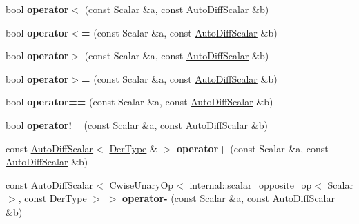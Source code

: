 \begin{DoxyCompactItemize}
bool {\bfseries operator$<$} (const Scalar \&a, const \hyperlink{class_eigen_1_1_auto_diff_scalar}{Auto\+Diff\+Scalar} \&b)
\item 
\mbox{\label{class_eigen_1_1_auto_diff_scalar_adbe3f187ba731644689b7908c1edbe22}} 
bool {\bfseries operator$<$=} (const Scalar \&a, const \hyperlink{class_eigen_1_1_auto_diff_scalar}{Auto\+Diff\+Scalar} \&b)
\item 
\mbox{\label{class_eigen_1_1_auto_diff_scalar_abf6b293bf812336bd22db1a4d1894751}} 
bool {\bfseries operator$>$} (const Scalar \&a, const \hyperlink{class_eigen_1_1_auto_diff_scalar}{Auto\+Diff\+Scalar} \&b)
\item 
\mbox{\label{class_eigen_1_1_auto_diff_scalar_af1c73c080143c2e35e61c4655bacbb44}} 
bool {\bfseries operator$>$=} (const Scalar \&a, const \hyperlink{class_eigen_1_1_auto_diff_scalar}{Auto\+Diff\+Scalar} \&b)
\item 
\mbox{\label{class_eigen_1_1_auto_diff_scalar_aca029e0c06ceede1858ee90101484d28}} 
bool {\bfseries operator==} (const Scalar \&a, const \hyperlink{class_eigen_1_1_auto_diff_scalar}{Auto\+Diff\+Scalar} \&b)
\item 
\mbox{\label{class_eigen_1_1_auto_diff_scalar_ad4fbf9cab7f13777cab64dc8b262f14b}} 
bool {\bfseries operator!=} (const Scalar \&a, const \hyperlink{class_eigen_1_1_auto_diff_scalar}{Auto\+Diff\+Scalar} \&b)
\item 
\mbox{\label{class_eigen_1_1_auto_diff_scalar_a5fbecd5e2e18e75ebed2a439c662a3a1}} 
const \hyperlink{class_eigen_1_1_auto_diff_scalar}{Auto\+Diff\+Scalar}$<$ \hyperlink{group___sparse_core___module}{Der\+Type} \& $>$ {\bfseries operator+} (const Scalar \&a, const \hyperlink{class_eigen_1_1_auto_diff_scalar}{Auto\+Diff\+Scalar} \&b)
\item 
\mbox{\label{class_eigen_1_1_auto_diff_scalar_a64be15e08f3db2e24a97f3eaabc7160b}} 
const \hyperlink{class_eigen_1_1_auto_diff_scalar}{Auto\+Diff\+Scalar}$<$ \hyperlink{group___core___module_class_eigen_1_1_cwise_unary_op}{Cwise\+Unary\+Op}$<$ \hyperlink{struct_eigen_1_1internal_1_1scalar__opposite__op}{internal\+::scalar\+\_\+opposite\+\_\+op}$<$ Scalar $>$, const \hyperlink{group___sparse_core___module}{Der\+Type} $>$ $>$ {\bfseries operator-\/} (const Scalar \&a, const \hyperlink{class_eigen_1_1_auto_diff_scalar}{Auto\+Diff\+Scalar} \&b)

\end{DoxyCompactItemize}
